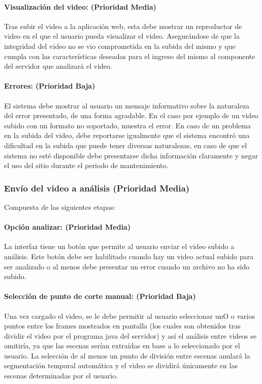 \documentclass[a4paper]{article}
\begin{document}
{        \paragraph{Visualización del video: (Prioridad Media) }
        Tras subir el video a la aplicación web, esta debe mostrar un reproductor de video en el que el usuario pueda visualizar el video. Asegurándose de que la integridad del video no se vio comprometida en la subida del mismo y que cumpla con las características deseadas para el ingreso del mismo al componente del servidor que analizará el video. \\

		\paragraph{Errores: (Prioridad Baja) }
		El sistema debe mostrar al usuario un mensaje informativo sobre la naturaleza del error presentado, de una forma agradable. En el caso por ejemplo de un video subido con un formato no soportado, muestra el error. En caso de un problema en la subida del video, debe reportarse igualmente que el sistema encontró una dificultad en la subida que puede tener diversas naturalezas, en caso de que el sistema no esté disponible debe presentarse dicha información claramente y negar el uso del sitio durante el periodo de mantenimiento.  \\

	\subsubsection{Envío del video a análisis (Prioridad Media) }
    	Compuesta de las siguientes etapas: \\
        
    	\paragraph{Opción analizar: (Prioridad Media) }
        	La interfaz tiene un botón que permite al usuario enviar el video subido a análisis. Este botón debe ser habilitado cuando hay un video actual subido para ser analizado o al menos debe presentar un error cuando un archivo no ha sido subido. \\
            
        \paragraph{Selección de punto de corte manual: (Prioridad Baja) } 
        	Una vez cargado el video, se le debe permitir al usuario seleccionar unO o varios puntos entre los frames mostrados en pantalla (los cuales son obtenidos tras dividir el video por el programa java del servidor) y así el análisis entre videos se omitiría, ya que las escenas serían extraídas en base a lo seleccionado por el usuario. La selección de al menos un punto de división entre escenas anulará la segmentación temporal automática y el video se dividirá únicamente en las escenas determinadas por el usuario. \\
            
}
\end{document}
